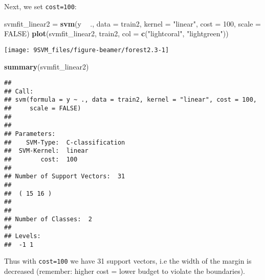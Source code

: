 \documentclass[10pt,ignorenonframetext,]{beamer}
\newenvironment{Shaded}{\begin{snugshade}}{\end{snugshade}}
\newcommand{\DataTypeTok}[1]{\textcolor[rgb]{0.13,0.29,0.53}{#1}}
\newcommand{\DecValTok}[1]{\textcolor[rgb]{0.00,0.00,0.81}{#1}}
\newcommand{\KeywordTok}[1]{\textcolor[rgb]{0.13,0.29,0.53}{\textbf{#1}}}
\newcommand{\NormalTok}[1]{#1}
\newcommand{\OperatorTok}[1]{\textcolor[rgb]{0.81,0.36,0.00}{\textbf{#1}}}
\newcommand{\OtherTok}[1]{\textcolor[rgb]{0.56,0.35,0.01}{#1}}
\newcommand{\StringTok}[1]{\textcolor[rgb]{0.31,0.60,0.02}{#1}}
\begin{document}
\begin{frame}[fragile]

Next, we set \texttt{cost=100}: \vspace{2mm}

\scriptsize

\begin{Shaded}
\begin{Highlighting}[]
\NormalTok{svmfit_linear2 =}\StringTok{ }\KeywordTok{svm}\NormalTok{(y }\OperatorTok{~}\StringTok{ }\NormalTok{., }\DataTypeTok{data =}\NormalTok{ train2, }\DataTypeTok{kernel =} \StringTok{"linear"}\NormalTok{, }\DataTypeTok{cost =} \DecValTok{100}\NormalTok{, }
    \DataTypeTok{scale =} \OtherTok{FALSE}\NormalTok{)}
\KeywordTok{plot}\NormalTok{(svmfit_linear2, train2, }\DataTypeTok{col =} \KeywordTok{c}\NormalTok{(}\StringTok{"lightcoral"}\NormalTok{, }\StringTok{"lightgreen"}\NormalTok{))}
\end{Highlighting}
\end{Shaded}

\begin{center}\texttt{[image: 9SVM\_files/figure-beamer/forest2.3-1]} \end{center}

\end{frame}

\begin{frame}[fragile]

\scriptsize

\begin{Shaded}
\begin{Highlighting}[]
\KeywordTok{summary}\NormalTok{(svmfit_linear2)}
\end{Highlighting}
\end{Shaded}

\begin{verbatim}
## 
## Call:
## svm(formula = y ~ ., data = train2, kernel = "linear", cost = 100, 
##     scale = FALSE)
## 
## 
## Parameters:
##    SVM-Type:  C-classification 
##  SVM-Kernel:  linear 
##        cost:  100 
## 
## Number of Support Vectors:  31
## 
##  ( 15 16 )
## 
## 
## Number of Classes:  2 
## 
## Levels: 
##  -1 1
\end{verbatim}

\normalsize

Thus with \texttt{cost=100} we have 31 support vectors, i.e the width of
the margin is decreased (remember: higher cost = lower budget to violate
the boundaries).

\end{frame}
\end{document}
